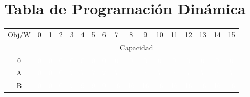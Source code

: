 \documentclass{article}
\begin{document}
\section*{Tabla de Programación Dinámica}
\begin{center}
\scriptsize
\begin{tabular}{|c|c|c|c|c|c|c|c|c|c|c|c|c|c|c|c|c|}
\hline
\multirow{2}{*}{Obj/W} & \multicolumn{1}{c|}{0} & \multicolumn{1}{c|}{1} & \multicolumn{1}{c|}{2} & \multicolumn{1}{c|}{3} & \multicolumn{1}{c|}{4} & \multicolumn{1}{c|}{5} & \multicolumn{1}{c|}{6} & \multicolumn{1}{c|}{7} & \multicolumn{1}{c|}{8} & \multicolumn{1}{c|}{9} & \multicolumn{1}{c|}{10} & \multicolumn{1}{c|}{11} & \multicolumn{1}{c|}{12} & \multicolumn{1}{c|}{13} & \multicolumn{1}{c|}{14} & \multicolumn{1}{c|}{15} \\ \cline{2-17}
& \multicolumn{16}{c|}{Capacidad} \\ \hline
0 & \cellcolor{rojo}\textcolor{white}{0} & \cellcolor{rojo}\textcolor{white}{0} & \cellcolor{rojo}\textcolor{white}{0} & \cellcolor{rojo}\textcolor{white}{0} & \cellcolor{rojo}\textcolor{white}{0} & \cellcolor{rojo}\textcolor{white}{0} & \cellcolor{rojo}\textcolor{white}{0} & \cellcolor{rojo}\textcolor{white}{0} & \cellcolor{rojo}\textcolor{white}{0} & \cellcolor{rojo}\textcolor{white}{0} & \cellcolor{rojo}\textcolor{white}{0} & \cellcolor{rojo}\textcolor{white}{0} & \cellcolor{rojo}\textcolor{white}{0} & \cellcolor{rojo}\textcolor{white}{0} & \cellcolor{rojo}\textcolor{white}{0} & \cellcolor{rojo}\textcolor{white}{0} \\ \hline
A & \cellcolor{rojo}\textcolor{white}{0} & \cellcolor{rojo}\textcolor{white}{0} & \cellcolor{rojo}\textcolor{white}{0} & \cellcolor{verde}\textcolor{white}{7} & \cellcolor{verde}\textcolor{white}{7} & \cellcolor{verde}\textcolor{white}{7} & \cellcolor{verde}\textcolor{white}{7} & \cellcolor{verde}\textcolor{white}{7} & \cellcolor{verde}\textcolor{white}{7} & \cellcolor{verde}\textcolor{white}{7} & \cellcolor{verde}\textcolor{white}{7} & \cellcolor{verde}\textcolor{white}{7} & \cellcolor{verde}\textcolor{white}{7} & \cellcolor{verde}\textcolor{white}{7} & \cellcolor{verde}\textcolor{white}{7} & \cellcolor{verde}\textcolor{white}{7} \\ \hline
B & \cellcolor{rojo}\textcolor{white}{0} & \cellcolor{rojo}\textcolor{white}{0} & \cellcolor{rojo}\textcolor{white}{0} & \cellcolor{rojo}\textcolor{white}{7} & \cellcolor{verde}\textcolor{white}{9} & \cellcolor{verde}\textcolor{white}{9} & \cellcolor{verde}\textcolor{white}{9} & \cellcolor{verde}\textcolor{white}{16} & \cellcolor{verde}\textcolor{white}{16} & \cellcolor{verde}\textcolor{white}{16} & \cellcolor{verde}\textcolor{white}{16} & \cellcolor{verde}\textcolor{white}{16} & \cellcolor{verde}\textcolor{white}{16} & \cellcolor{verde}\textcolor{white}{16} & \cellcolor{verde}\textcolor{white}{16} & \cellcolor{verde}\textcolor{white}{16} \\ \hline

\end{tabular}
\end{center}
\end{document}
